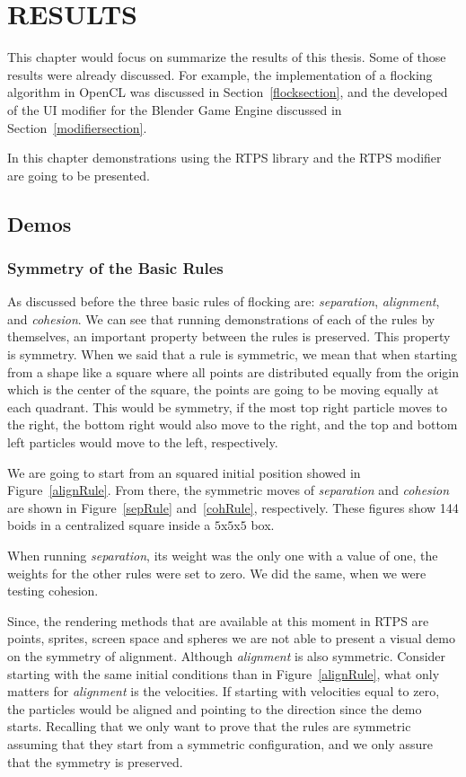 \chapter{RESULTS}

This chapter would focus on summarize the results of this thesis. Some of those results were already discussed. For example, the implementation of a flocking algorithm in OpenCL was discussed in Section~\ref{flocksection}, and the developed of the UI modifier for the Blender Game Engine discussed in Section~\ref{modifiersection}. 

In this chapter demonstrations using the RTPS library and the RTPS modifier are going to be presented.

\section{Demos}

\subsection{Symmetry of the Basic Rules}
As discussed before the three basic rules of flocking are: \textit{separation}, \textit{alignment}, and \textit{cohesion}. We can see that running demonstrations of each of the rules by themselves, an important property between the rules is preserved. This property is symmetry. When we said that a rule is symmetric, we mean that when starting from a shape like a square where all points are distributed equally from the origin which is the center of the square, the points are going to be moving equally at each quadrant. This would be symmetry, if the most top right particle moves to the right, the bottom right would also move to the right, and the top and bottom left particles would move to the left, respectively.

We are going to start from an squared initial position showed in Figure~\ref{alignRule}. From there, the symmetric moves of \textit{separation} and \textit{cohesion} are shown in Figure~\ref{sepRule} and~\ref{cohRule}, respectively. These figures show 144 boids in a centralized square inside a $5$x$5$x$5$ box.

When running \textit{separation}, its weight was the only one with a value of one, the weights for the other rules were set to zero. We did the same, when we were testing cohesion.

Since, the rendering methods that are available at this moment in RTPS are points, sprites, screen space and spheres we are not able to present a visual demo on the symmetry of alignment. Although \textit{alignment} is also symmetric. Consider starting with the same initial conditions than in Figure~\ref{alignRule}, what only matters for \textit{alignment} is the velocities. If starting with velocities equal to zero, the particles would be aligned and pointing to the direction since the demo starts. Recalling that we only want to prove that the rules are symmetric assuming that they start from a symmetric configuration, and we only assure that the symmetry is preserved.

